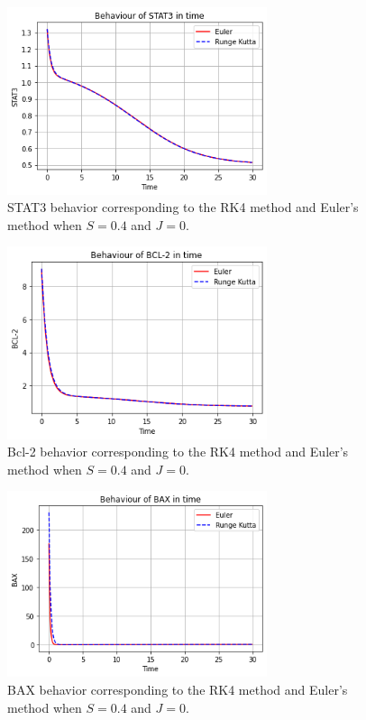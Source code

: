 \begin{figure}[hbt!]
	\centering
	\begin{framed}
	\includegraphics[width=0.68\textwidth]{Figures/C/N4.png}
		\end{framed}
	\caption{STAT3 behavior corresponding to the RK4 method and Euler's method when $S =0.4$ and $J=0$.}
	\label{r16}
\end{figure}

\begin{figure}[hbt!]
	\centering
	\begin{framed}
	\includegraphics[width=0.68\textwidth]{Figures/C/N5.png}
		\end{framed}
	\caption{Bcl-2 behavior corresponding to the RK4 method and Euler's method when $S =0.4$ and $J=0$.}
	\label{r17}
\end{figure}

\begin{figure}[hbt!]
	\centering
	\begin{framed}
	\includegraphics[width=0.68\textwidth]{Figures/C/N6.png}
		\end{framed}
	\caption{BAX behavior corresponding to the RK4 method and Euler's method when $S =0.4$ and $J=0$.}
	\label{r18}
\end{figure}

